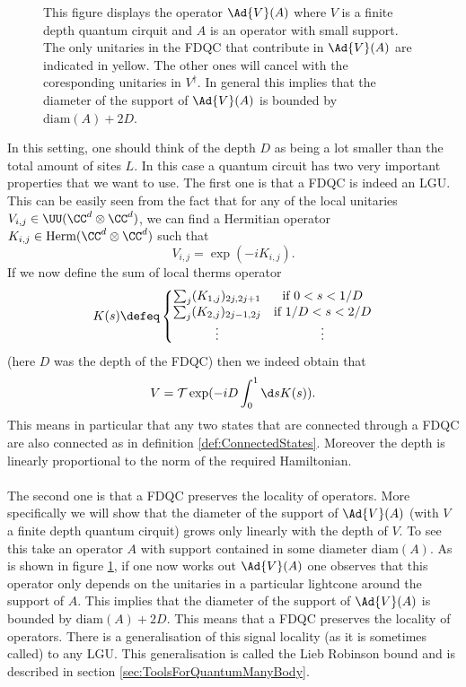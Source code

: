 \begin{figure}
	\centering
	
	\caption{This figure displays the operator $\Ad{V}(A)$ where $V$ is a finite depth quantum cirquit and $A$ is an operator with small support. The only unitaries in the FDQC that contribute in $\Ad{V}(A)$ are indicated in yellow. The other ones will cancel with the coresponding unitaries in $V^\dagger$. In general this implies that the diameter of the support of $\Ad{V}(A)$ is bounded by $\text{diam}(A)+2D$.}
	\label{fig:FiniteDepthQuantumCirquitLightcone}
\end{figure}
In this setting, one should think of the depth $D$ as being a lot smaller than the total amount of sites $L$. In this case a quantum circuit has two very important properties that we want to use. The first one is that a FDQC is indeed an LGU. This can be easily seen from the fact that for any of the local unitaries $V_{i,j}\in\UU(\CC^d\otimes\CC^d)$, we can find a Hermitian operator $K_{i,j}\in\textrm{Herm}(\CC^d\otimes\CC^d)$ such that
\begin{equation}
	V_{i,j}=\exp(-i K_{i,j}).
\end{equation}
If we now define the sum of local therms operator
\begin{equation}
	K(s)\defeq \left\{\begin{matrix}
		\sum_{j}(K_{1,j})_{2j,2j+1}&\text{if }0<s<1/D\\
		\sum_{j}(K_{2,j})_{2j-1,2j}&\text{if }1/D<s<2/D\\
		\vdots&\vdots
	\end{matrix}\right.
\end{equation}
(here $D$ was the depth of the FDQC) then we indeed obtain that
\begin{equation}
	V=\mathcal{T}\exp(-iD\int_0^1 \d s K(s)).
\end{equation}
This means in particular that any two states that are connected through a FDQC are also connected as in definition \ref{def:ConnectedStates}. Moreover the depth is linearly proportional to the norm of the required Hamiltonian.\\\\
The second one is that a FDQC preserves the locality of operators. More specifically we will show that the diameter of the support of $\Ad{V}(A)$ (with $V$ a finite depth quantum cirquit) grows only linearly with the depth of $V$. To see this take an operator $A$ with support contained in some diameter $\text{diam}(A)$. As is shown in figure \ref{fig:FiniteDepthQuantumCirquitLightcone}, if one now works out $\Ad{V}(A)$ one observes that this operator only depends on the unitaries in a particular lightcone around the support of $A$. This implies that the diameter of the support of $\Ad{V}(A)$ is bounded by $\text{diam}(A)+2D$. This means that a FDQC preserves the locality of operators. There is a generalisation of this signal locality (as it is sometimes called) to any LGU. This generalisation is called the Lieb Robinson bound and is described in section \ref{sec:ToolsForQuantumManyBody}.
